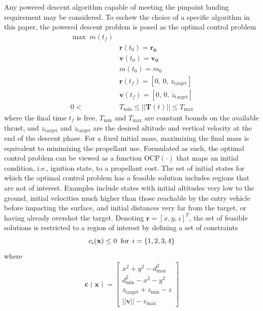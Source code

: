 \documentclass[letterpaper, paper,11pt]{AAS}
\begin{document}
Any powered descent algorithm capable of meeting the pinpoint landing requirement may be considered. To eschew the choice of a specific algorithm in this paper, the powered descent problem is posed as the optimal control problem
\begin{align}
\max \;m(t_f) \label{eq_srp_ocp}\\
&\mathbf{r}(t_0) = \mathbf{r_0} \\
&\mathbf{v}(t_0) = \mathbf{v_0} \\
&m(t_0) = m_0\\
&\mathbf{r}(t_f) = [0,\, 0,\, z_{\mathrm{target}}] \\
&\mathbf{v}(t_f) = [0,\, 0,\, \dot{z}_{\mathrm{target}}] \\
0 <\,\, &T_{\min} \le ||\mathbf{T}(t)|| \le T_{\max}
\end{align}
where the final time $t_f$ is free, $T_{\min}$ and $ T_{\max} $ are constant bounds on the available thrust, and $z_{\mathrm{target}}$ and $\dot{z}_{\mathrm{target}}$ are the desired altitude and vertical velocity at the end of the descent phase. For a fixed initial mass, maximizing the final mass is equivalent to minimizing the propellant use. Formulated as such, the optimal control problem can be viewed as a function $\mathrm{OCP}(\cdot)$ that maps an initial condition, i.e., ignition state, to a propellant cost. 
The set of initial states for which the optimal control problem has a feasible solution includes regions that are not of interest. Examples include states with initial altitudes very low to the ground, initial velocities much higher than those reachable by the entry vehicle before impacting the surface, and initial distances very far from the target, or having already overshot the target. Denoting $\mathbf{r} = [x,y,z]^T$, the set of feasible solutions is restricted to a region of interest by defining a set of constraints
\begin{equation}
c_i(\mathbf{x})\le 0\:\; \mathrm{for}\,\;i=\{1,2,3,4\}\\
\end{equation} where 
\begin{align}
\mathbf{c}(\mathbf{x}) = \left[ \begin{array}{lc}
        x^2 + y^2 - d^2_{\max}\\
        d^2_{\min} - x^2 - y^2\\
        z_{\mathrm{target}} + z_{\min} - z \\
        ||\textbf{v}|| - v_{\max}
        \end{array} \right]\label{eq_constraints} 
\end{align} 
\end{document}
